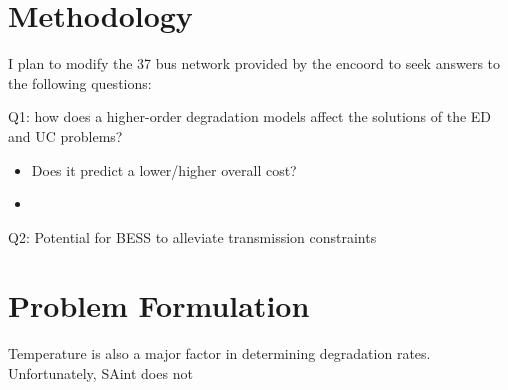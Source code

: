 \documentclass{homework}
\begin{document}
\section{Methodology}

I plan to modify the 37 bus network provided by the encoord to seek answers to the following questions:

\begin{letterenum}
\item Q1: how does a higher-order degradation models affect the solutions of the ED and UC problems?
\begin{itemize}
    \item Does it predict a lower/higher overall cost?
    \item 
\end{itemize} 
\item Q2: Potential for BESS to alleviate transmission constraints
\end{letterenum}

\section{Problem Formulation}





Temperature is also a major factor in determining degradation rates. 
Unfortunately, SAint does not 
\end{document}
